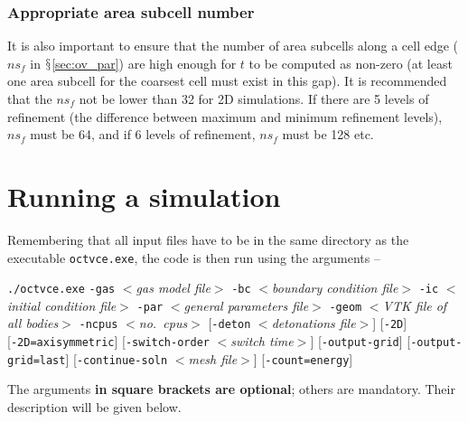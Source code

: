 \documentclass[pdftex, 12pt, a4paper]{report}
\begin{document}
\subsection{Appropriate area subcell number}\label{sec:twoD_subcell}

It is also important to ensure that the number of area subcells along a cell edge ($ns_f$ in $\mathsection$\ref{sec:ov_par}) are 
high enough for $t$ to be computed as non-zero (at least one area subcell for the coarsest cell must exist in this
gap).  It is recommended that the $ns_f$ not be lower than 32 for 2D simulations.  If there are 5 levels of refinement (the difference
between maximum and minimum refinement levels), $ns_f$ must be 64, and if 6 levels of refinement, $ns_f$ must be 128 etc.

\chapter{Running a simulation}\label{sec:sim_run}

Remembering that all input files have to be in the same directory as the executable \verb'octvce.exe', the code is then run using the 
arguments --

\verb'./octvce.exe' \verb'-gas' $<$\emph{gas model file}$>$ \verb'-bc' $<$\emph{boundary condition file}$>$ \verb'-ic' $<$\emph{initial condition file}$>$ \verb'-par' $<$\emph{general parameters file}$>$ \verb'-geom' $<$\emph{VTK file of all bodies}$>$ \verb'-ncpus' $<$\emph{no.\ cpus}$>$ [\verb'-deton' $<$\emph{detonations file}$>$] [\verb'-2D'] [\verb'-2D=axisymmetric'] [\verb'-switch-order' $<$\emph{switch time}$>$] [\verb'-output-grid'] [\verb'-output-grid=last'] [\verb'-continue-soln' $<$\emph{mesh file}$>$] [\verb'-count=energy']

The arguments \textbf{in square brackets are optional}; others are mandatory.  Their description will be given below.
\end{document}
